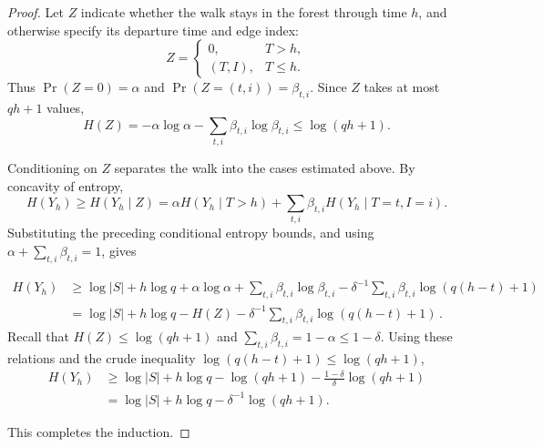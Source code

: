 \documentclass[10pt,a4paper]{amsart}
\begin{document}
\begin{proof}
Let $Z$ indicate whether the walk stays in the forest through
time $h$, and otherwise specify its departure time and edge index:
\[
 Z=
 \begin{cases}
  0,&T>h,\\
  (T,I),&T\le h.
 \end{cases}
\]
Thus $\Pr(Z=0)=\alpha$ and $\Pr(Z=(t,i))=\beta_{t,i}$.
Since $Z$ takes at most $qh+1$ values,
\[
 H(Z)=-\alpha\log\alpha-\sum_{t,i}\beta_{t,i}\log\beta_{t,i}
 \le\log(qh+1).
\]

Conditioning on $Z$ separates the walk into the cases
estimated above. By concavity of entropy,
\[
 H(Y_h)
 \ge H(Y_h\mid Z) =\alpha H(Y_h\mid T>h)
   +\sum_{t,i}\beta_{t,i}H(Y_h\mid T=t,I=i).
\]
Substituting the preceding conditional entropy bounds, and using
$\alpha+\sum_{t,i}\beta_{t,i}=1$, gives

\begin{align*}
 H(Y_h)
 &\ge \log|S|+h\log q
      +\alpha\log\alpha+\sum_{t,i}\beta_{t,i}\log\beta_{t,i}
      -\delta^{-1}\sum_{t,i}\beta_{t,i}\log(q(h-t)+1)\\
 &=\log|S|+h\log q-H(Z)
      -\delta^{-1}\sum_{t,i}\beta_{t,i}\log(q(h-t)+1)\,.
\end{align*}
Recall that $H(Z)\le\log(qh+1)$ and
$\sum_{t,i}\beta_{t,i}=1-\alpha\le1-\delta$. Using these relations and the crude inequality $\log(q(h-t)+1)\le\log(qh+1)$,
\[
 \begin{aligned}
 H(Y_h)  &\ge\log|S|+h\log q-\log(qh+1)
      -\frac{1-\delta}{\delta}\log(qh+1)\\
 &=\log|S|+h\log q-\delta^{-1}\log(qh+1).
 \end{aligned}
\]

This completes the induction.
\end{proof}
\end{document}

